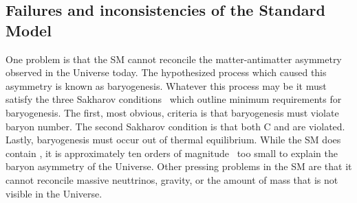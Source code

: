 \subsection{Failures and inconsistencies of the Standard Model}
\label{sec:bsm:fail}
One problem is that the SM cannot reconcile the matter-antimatter asymmetry observed in the
Universe today.
The hypothesized process which caused this asymmetry is known as baryogenesis.
Whatever this process may be it must satisfy the three Sakharov
conditions~\cite{1991SvPhU..34..392S} which outline minimum requirements for baryogenesis.
The first, most obvious, criteria is that baryogenesis must violate baryon number.
The second Sakharov condition is that both C and \CP are violated.
Lastly, baryogenesis must occur out of thermal equilibrium.
While the SM does contain \CPV, it is approximately ten orders of
magnitude~\cite{Cline:2006ts,Huet:1994jb} too small to explain the baryon asymmetry of the
Universe.
Other pressing problems in the SM are that it cannot reconcile massive neuttrinos, gravity, or the
amount of mass that is not visible in the Universe.


